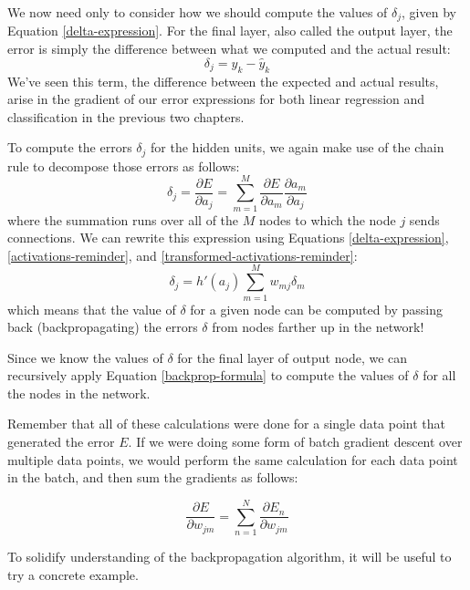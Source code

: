 We now need only to consider how we should compute the values of $\delta_{j}$, given by Equation \ref{delta-expression}.
For the final layer, also called the output layer, the error is simply the difference between what we computed and the actual result:
\begin{equation*}
	\delta_{j} = y_{k} - \hat{y}_{k}
\end{equation*}
We've seen this term, the difference between the expected and actual results, arise in the gradient of our error expressions for both linear regression and classification in the previous two chapters.

To compute the errors $\delta_{j}$ for the hidden units, we again make use of the chain rule to decompose those errors as follows:
\begin{equation} \label{backprop-for-deltas}
	\delta_{j} = \frac{\partial E}{\partial a_{j}} = \sum_{m=1}^{M} \frac{\partial E}{\partial a_{m}} \frac{\partial a_{m}}{\partial a_{j}} 
\end{equation}
where the summation runs over all of the $M$ nodes to which the node $j$ sends connections. We can rewrite this expression using Equations \ref{delta-expression}, \ref{activations-reminder}, and \ref{transformed-activations-reminder}:
\begin{equation} \label{backprop-formula}
	\delta_{j} = h'(a_{j}) \sum_{m=1}^{M} w_{mj} \delta_{m}
\end{equation}
which means that the value of $\delta$ for a given node can be computed by passing back (backpropagating) the errors $\delta$ from nodes farther up in the network!

Since we know the values of $\delta$ for the final layer of output node, we can recursively apply Equation \ref{backprop-formula} to compute the values of $\delta$ for all the nodes in the network.

Remember that all of these calculations were done for a single data point that generated the error $E$. If we were doing some form of batch gradient descent over multiple data points, we would perform the same calculation for each data point in the batch, and then sum the gradients as follows:

\begin{equation} \label{batch-errors-backprop}
	\frac{\partial E}{\partial w_{jm}} = \sum_{n=1}^{N} \frac{\partial E_{n}}{\partial w_{jm}}
\end{equation}

To solidify understanding of the backpropagation algorithm, it will be useful to try a concrete example.

